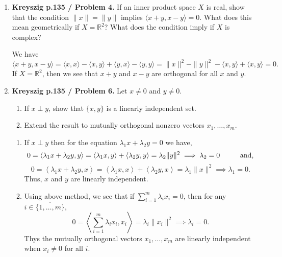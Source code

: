 \documentclass[12pt]{article}
\newcommand{\rl}{\mathbb{R}}
\newcommand{\inn}[2]{\left\langle #1, #2 \right\rangle}
\begin{document}
\begin{enumerate}
 
\item \textbf{Kreyszig p.135 / Problem 4.}
If an inner product space $X$ is real, show that the
condition $\|x\|= \|y\|$ implies $\langle x + y, x - y
\rangle = 0$.
What does this mean geometrically if $X = \rl^2$? What
does the condition imply if $X$ is complex?
\begin{mybox}

    We have $\langle x + y, x - y \rangle = 
    \langle x, x \rangle - \langle x, y \rangle+
    \langle y, x \rangle- \langle y, y \rangle=
    \|x\|^2-\|y\|^2- \langle x, y \rangle+
    \langle x, y \rangle=0.$ If $X=\rl^2$, then we see
    that $x+y$ and $x-y$ are orthogonal for all $x$ and
    $y$.
\end{mybox}

\item \textbf{Kreyszig p.135 / Problem 6.}
Let $x\neq 0$ and $y\neq 0$.
\begin{enumerate}
    \item If $x\perp y$, show that $\{x, y\}$ is a
    linearly independent set.
    \item Extend the result to mutually
    orthogonal nonzero
    vectors $x_1,\ldots, x_m$.
\end{enumerate}

\begin{mybox}

    \begin{enumerate}
        \item If $x\perp y$ then for the equation
        $\lambda_1 x+\lambda_2 y=0$ we have,
        $$0=\inn{\lambda_1 x+\lambda_2 y}{y}=
        \inn{\lambda_1 x}{y}+\inn{\lambda_2 y}{y}=
        \lambda_2\|y\|^2\implies \lambda_2=0
        \hspace*{10mm}\text{and,}$$
        $$0=\inn{\lambda_1 x+\lambda_2 y}{x}=
        \inn{\lambda_1 x}{x}+\inn{\lambda_2 y}{x}=
        \lambda_1\|x\|^2\implies \lambda_1=0.$$
        Thus, $x$ and $y$ are linearly independent.

        \vspace*{3mm}
        \item Using above method, we see that if
        $\sum_{i=1}^m{\lambda_i x_i}=0$, then for any
        $i\in \overline{\{1,\ldots, m\}},$
        $$0=\inn{\sum_{i=1}^m{\lambda_i x_i}}{x_i}
        =\lambda_i\|x_i\|^2\implies \lambda_i=0.$$
        Thys the mutually orthogonal vectors $x_1,\ldots
        ,x_m$ are linearly independent when $x_i\neq 0$
        for all $i$.
    \end{enumerate}
\end{mybox}
 

\end{enumerate}
\end{document}
